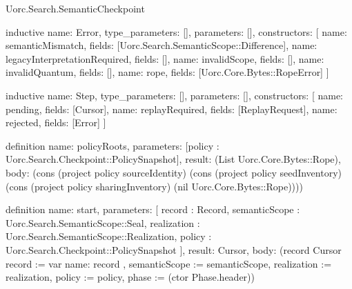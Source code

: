 \begin{lexlean}{Uorc.Search.SemanticCheckpoint}
\begin{semanticmodule}
inductive{
  name: Error,
  type_parameters: [],
  parameters: [],
  constructors: [
    {name: semanticMismatch, fields: [Uorc.Search.SemanticScope::Difference]},
    {name: legacyInterpretationRequired, fields: []},
    {name: invalidScope, fields: []},
    {name: invalidQuantum, fields: []},
    {name: rope, fields: [Uorc.Core.Bytes::RopeError]}
  ]
}

inductive{
  name: Step,
  type_parameters: [],
  parameters: [],
  constructors: [
    {name: pending, fields: [Cursor]},
    {name: replayRequired, fields: [ReplayRequest]},
    {name: rejected, fields: [Error]}
  ]
}

definition{
  name: policyRoots,
  parameters: [policy : Uorc.Search.Checkpoint::PolicySnapshot],
  result: (List Uorc.Core.Bytes::Rope),
  body: (cons (project policy sourceIdentity) (cons (project policy seedInventory) (cons (project policy sharingInventory) (nil Uorc.Core.Bytes::Rope))))
}

definition{
  name: start,
  parameters: [
    record : Record,
    semanticScope : Uorc.Search.SemanticScope::Seal,
    realization : Uorc.Search.SemanticScope::Realization,
    policy : Uorc.Search.Checkpoint::PolicySnapshot
  ],
  result: Cursor,
  body: (record Cursor {record := var{
    name: record
  }, semanticScope := semanticScope, realization := realization, policy := policy, phase := (ctor Phase.header)})
}


\end{semanticmodule}
\end{lexlean}
